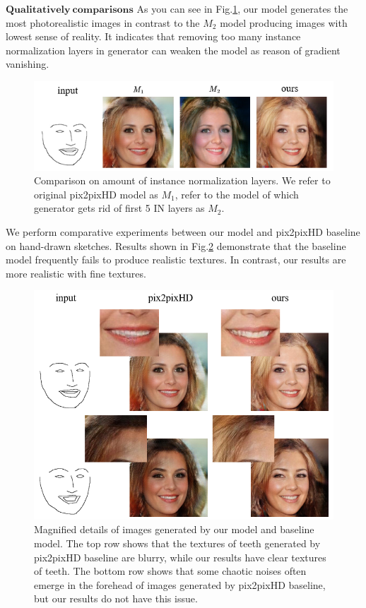 \documentclass[10pt,twocolumn,letterpaper]{article}
\begin{document}
\noindent
$\mathbf{Qualitatively ~comparisons}$ As you can see in Fig.\ref{fig:ablation}, our model generates the most photorealistic images in contrast to the $M_2$ model producing images with lowest sense of reality. It indicates that removing too many instance normalization layers in generator can weaken the model as reason of gradient vanishing.
\begin{figure}[htb]
	\centering
	\includegraphics[width=0.5 \textwidth]{ablation.png}
	\caption{Comparison on amount of instance normalization layers. We refer to original pix2pixHD model as $M_1$, refer to the model of which generator gets rid of first 5 IN layers as $M_2$.}
	\label{fig:ablation}
\end{figure}  

We perform comparative experiments between our model and pix2pixHD baseline on hand-drawn sketches.
Results shown in Fig.\ref{fig:compare_1} demonstrate that the baseline model frequently fails to produce realistic textures. In contrast, our results are more realistic with fine textures.  
\begin{figure}[htb]
	\centering
	\includegraphics[width=0.45 \textwidth]{texture.png}
	\caption{Magnified details of images generated by our model and baseline model. The top row shows that the textures of teeth generated by pix2pixHD baseline are blurry, while our results have clear textures of teeth. The bottom row shows that some chaotic noises often emerge in the forehead of images generated by pix2pixHD baseline, but our results do not have this issue.}
	\label{fig:compare_1}
\end{figure}
\end{document}
